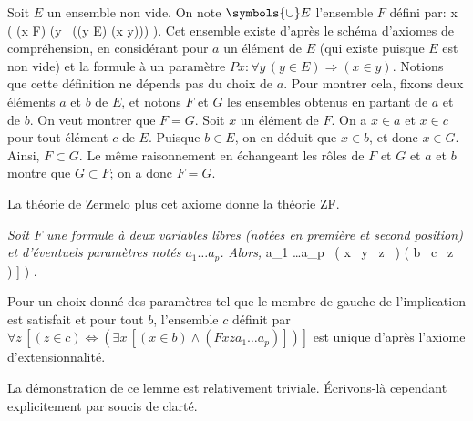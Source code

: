 \noindent
Soit $E$ un ensemble non vide. On note $\symbols{\cup} E$ l'ensemble $F$ défini par:
\startformula
    \forall x \, (
        (x \in F) \Leftrightarrow (\forall y \, ((y \in E) \Rightarrow (x \in y)))
    ).
\stopformula
Cet ensemble existe d'après le schéma d'axiomes de compréhension, en considérant pour $a$ un élément de $E$ (qui existe puisque $E$ est non vide) et la formule à un paramètre $P x: \forall y  \, (y \in E) \Rightarrow (x \in y)$. 
Notions que cette définition ne dépends pas du choix de $a$. 
Pour montrer cela, fixons deux éléments $a$ et $b$ de $E$, et notons $F$ et $G$ les ensembles obtenus en partant de $a$ et de $b$. 
On veut montrer que $F = G$. 
Soit $x$ un élément de $F$. 
On a $x \in a$ et $x \in c$ pour tout élément $c$ de $E$. 
Puisque $b \in E$, on en déduit que $x \in b$, et donc $x \in G$.
Ainsi, $F \subset G$. 
Le même raisonnement en échangeant les rôles de $F$ et $G$ et $a$ et $b$ montre que $G \subset F$; on a donc $F = G$.

\startsubsection[title=Schéma d'axiomes de remplacement]

La théorie de Zermelo plus cet axiome donne la théorie ZF. 

\blank[medium]

\noindent\emph{ Soit $F$ une formule à deux variables libres (notées en première et second position) et d'éventuels paramètres notés $a_1 \dots a_p$. Alors, }
\startformula
    \forall a_1 \dots a_p \, 
        \left( 
            \forall x \, \forall y \, \forall z \, \left[
                (F x y a_1 \dots a_p \wedge F x z a_1 \dots a_p) \Rightarrow (z = y)
            \right]
        \right)
        \Rightarrow
        \left(
            \forall b \, \exists c \, \forall z \, \left[
                (z \in c) \Leftrightarrow (\exists x \, [(x \in b) \wedge (F x z a_1 \dots a_p)])
            \right]
        \right)
    .
\stopformula

\blank[medium]

\noindent{} Pour un choix donné des paramètres tel que le membre de gauche de l'implication est satisfait et pour tout $b$, l'ensemble $c$ définit par $\forall z \, \left[ (z \in c) \Leftrightarrow (\exists x \, [(x \in b) \wedge (F x z a_1 \dots a_p)]) \right]$ est unique d'après l'axiome d'extensionnalité.

\blank[medium]

La démonstration de ce lemme est relativement triviale. 
Écrivons-là cependant explicitement par soucis de clarté. 

